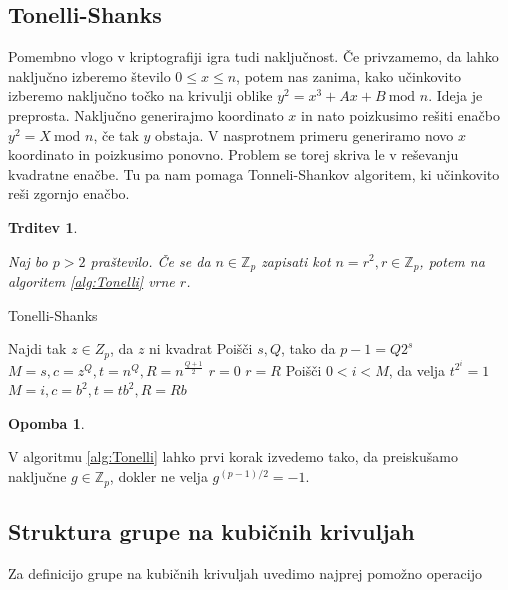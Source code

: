 \documentclass[12pt,a4paper,twoside]{article}
\theoremstyle{definition} %
\newtheorem{opomba}[definicija]{Opomba}
\theoremstyle{plain} %
\newtheorem{trditev}[definicija]{Trditev}
\numberwithin{equation}{section}  %
\newcommand{\Z}{\mathbb Z}
\begin{document}
\subsection{Tonelli-Shanks}
Pomembno vlogo v kriptografiji igra tudi naključnost. Če privzamemo, da lahko naključno izberemo število $0 \leq x \leq n$, potem nas zanima, kako učinkovito izberemo naključno točko na krivulji oblike
$y^2 = x^3 +Ax+B \ \text{mod } n$. Ideja je preprosta. Naključno generirajmo koordinato $x$ in nato poizkusimo rešiti enačbo $y^2 = X \ \text{mod } n$, če tak $y$ obstaja. V nasprotnem primeru generiramo novo $x$ koordinato in poizkusimo ponovno. Problem se torej skriva le v reševanju kvadratne enačbe. Tu pa nam pomaga Tonneli-Shankov algoritem, ki učinkovito reši zgornjo enačbo.

\begin{trditev}~

Naj bo $p > 2$ praštevilo. Če se da $n \in \Z_p$ zapisati kot $n = r^2, r \in \Z_p$, potem na algoritem \ref{alg:Tonelli} vrne $r$.

\end{trditev}

\begin{algorithm}[H]
\caption[Tonelli]{Tonelli-Shanks}
\label{alg:Tonelli}

\begin{algorithmic}
\State Najdi tak $z \in Z_p$, da $z$ ni kvadrat
\State Poišči $s,Q$, tako da $p-1 = Q2^s$
\State $M = s,c = z^Q,t = n^Q,R=n^{\frac{Q+1}{2}}$
		\State \Return $r=0$
		\State \Return $r=R$
	\Else
		\State Poišči $0<i<M$, da velja $t^{2^i} = 1$
		\State  $M = i,c = b^2,t = tb^2,R=Rb$
	\EndIf
\EndWhile

\end{algorithmic}
\end{algorithm}

\begin{opomba}~

V algoritmu \ref{alg:Tonelli} lahko prvi korak izvedemo tako, da preiskušamo naključne $g\in \Z_p$, dokler ne velja $g^{(p-1)/2} = -1$.
\end{opomba}


\subsection{Struktura grupe na kubičnih krivuljah}


Za definicijo grupe na kubičnih krivuljah uvedimo najprej pomožno operacijo
\end{document}
